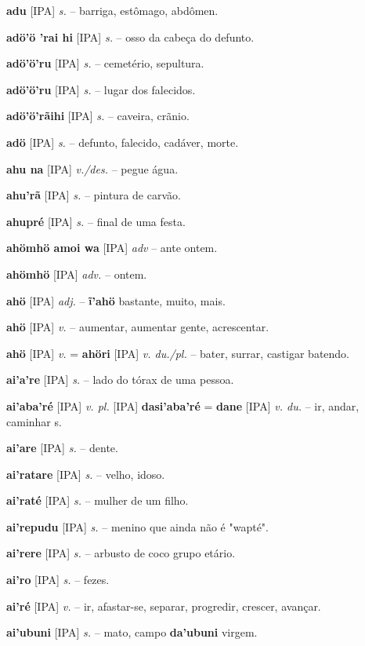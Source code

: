 \textbf{adu} [IPA] \textit{s.} -- barriga, estômago, abdômen.

\textbf{adö'ö 'rai hi} [IPA] \textit{s.} -- osso da cabeça do defunto.

\textbf{adö'ö'ru} [IPA] \textit{s.} -- cemetério, sepultura.

\textbf{adö'ö'ru} [IPA] \textit{s.} -- lugar dos falecidos.

\textbf{adö'ö'rãihi} [IPA] \textit{s.} -- caveira, crãnio.

\textbf{adö} [IPA] \textit{s.} -- defunto, falecido, cadáver, morte.

\textbf{ahu na} [IPA] \textit{v./des.} -- pegue água.

\textbf{ahu'rã} [IPA] \textit{s.} -- pintura de carvão.

\textbf{ahupré} [IPA] \textit{s.} -- final de uma festa.

\textbf{ahömhö amoi wa} [IPA] \textit{adv} -- ante ontem.

\textbf{ahömhö} [IPA] \textit{adv.} -- ontem.

\textbf{ahö} [IPA] \textit{adj.} -- \textbf{ĩ'ahö} bastante, muito, mais.

\textbf{ahö} [IPA] \textit{v.} -- aumentar, aumentar gente, acrescentar.

\textbf{ahö} [IPA] \textit{v.} = \textbf{ahöri} [IPA] \textit{v. du./pl.} -- bater, surrar, castigar batendo.

\textbf{ai'a're} [IPA] \textit{s.} -- lado do tórax de uma pessoa.

\textbf{ai'aba'ré} [IPA] \textit{v. pl.} [IPA] \textbf{dasi'aba'ré} = \textbf{dane} [IPA] \textit{v. du.} -- ir, andar, caminhar s.

\textbf{ai'are} [IPA] \textit{ s.} -- dente.

\textbf{ai'ratare} [IPA] \textit{s.} -- velho, idoso.

\textbf{ai'raté} [IPA] \textit{s.} -- mulher de um filho.

\textbf{ai'repudu} [IPA] \textit{s.} -- menino que ainda não é "wapté".

\textbf{ai'rere} [IPA] \textit{s.} -- arbusto de coco  grupo etário.

\textbf{ai'ro} [IPA] \textit{s.} -- fezes.

\textbf{ai'ré} [IPA] \textit{v.} -- ir, afastar-se, separar, progredir, crescer, avançar.

\textbf{ai'ubuni} [IPA] \textit{s.} -- mato, campo  \textbf{da'ubuni} virgem.

